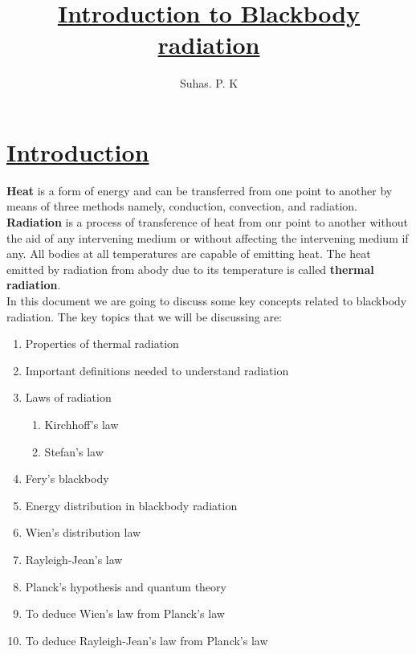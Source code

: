 \documentclass[14pt,a4paper]{article}
\title{\textbf{\underline{Introduction to Blackbody radiation}}}
\author{Suhas. P. K}
\date{}
\begin{document}
\maketitle


\section*{\underline{Introduction}}
\vspace{0.2cm}
\textbf{Heat} is a form of energy and can be transferred from one point to another by means of three methods namely, conduction, convection, and radiation.
\textbf{Radiation} is a process of transference of heat from onr point to another without the aid of any intervening medium or without affecting the intervening medium if any. All bodies at all temperatures are capable of emitting heat. The heat emitted by radiation from abody due to its temperature is called \textbf{thermal radiation}.
\\
In this document we are going to discuss some key concepts related to blackbody radiation. The key topics that we will be discussing are: 
\begin{enumerate}
	\item Properties of thermal radiation
	\item Important definitions needed to understand radiation
	\item Laws of radiation
	\begin{enumerate}
		\item Kirchhoff's law
		\item Stefan's law
	\end{enumerate}
	\item Fery's blackbody
	\item Energy distribution in blackbody radiation
	\item Wien's distribution law
	\item Rayleigh-Jean's law
	\item Planck's hypothesis and quantum theory
	\item To deduce Wien's law from Planck's law
	\item To deduce Rayleigh-Jean's law from Planck's law
\end{enumerate}  

\newpage
\end{document}
